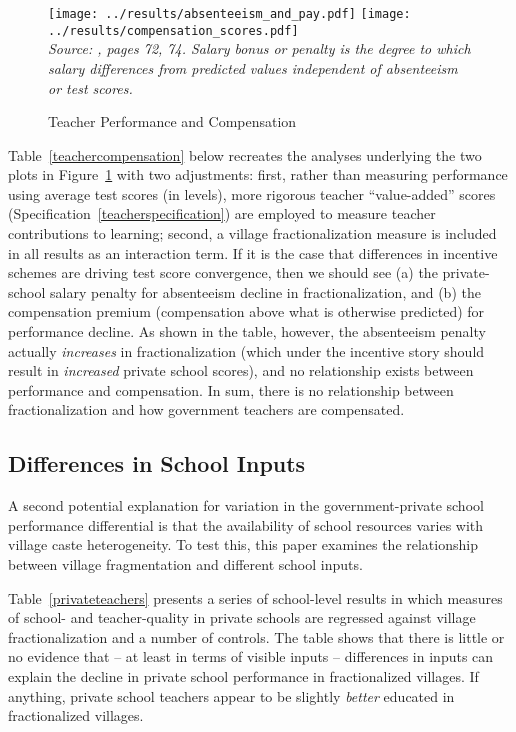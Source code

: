 \documentclass[Eubank_pk_ethnic_sorting.tex]{subfiles}
\begin{document}
\begin{figure}[htb]
	\begin{center}
	\caption{Teacher Performance and Compensation}\label{payandabsenteeism}
	\texttt{[image: ../results/absenteeism\_and\_pay.pdf]} \texttt{[image: ../results/compensation\_scores.pdf]}\\
	\emph{Source: \cite{Andrabi:2007we}, pages 72, 74. Salary bonus or penalty is the degree to which salary differences from predicted values independent of absenteeism or test scores.}
	\end{center}
\end{figure}

Table~\ref{teachercompensation} below recreates the analyses underlying the two plots in Figure~\ref{payandabsenteeism} with two adjustments: first, rather than measuring performance using average test scores (in levels), more rigorous teacher ``value-added'' scores (Specification~\ref{teacherspecification}) are employed to measure teacher contributions to learning; second, a village fractionalization measure is included in all results as an interaction term. If it is the case that differences in incentive schemes are driving test score convergence, then we should see (a) the private-school salary penalty for absenteeism decline in fractionalization, and (b) the compensation premium (compensation above what is otherwise predicted) for performance decline. As shown in the table, however, the absenteeism penalty actually \emph{increases} in fractionalization (which under the incentive story should result in \emph{increased} private school scores), and no relationship exists between performance and compensation. In sum, there is no relationship between fractionalization and how government teachers are compensated.





\subsection{Differences in School Inputs}

A second potential explanation for variation in the government-private school performance differential is that the availability of school resources varies with village caste heterogeneity. To test this, this paper examines the relationship between village fragmentation and different school inputs. 

Table~\ref{privateteachers} presents a series of school-level results in which measures of school- and teacher-quality in private schools are regressed against village fractionalization and a number of controls. The table shows that there is little or no evidence that -- at least in terms of visible inputs -- differences in inputs can explain the decline in private school performance in fractionalized villages. If anything, private school teachers appear to be slightly \emph{better} educated in fractionalized villages.

\end{document}
